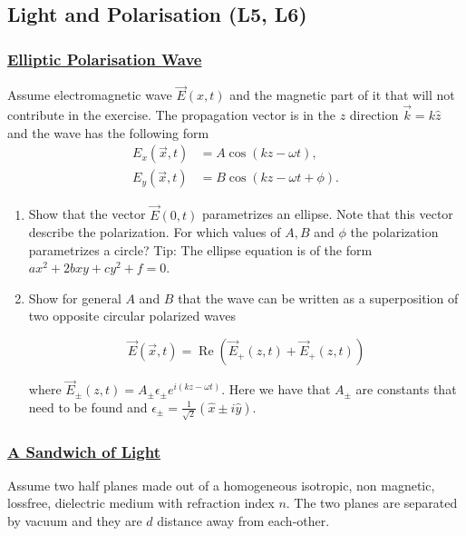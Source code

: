 \subsection{Light and Polarisation (\textbf{L5, L6})}

\subsubsection{\hyperref[EllipticPolarisationWave]{Elliptic Polarisation Wave}}

Assume electromagnetic wave $\vec{E}(x, t)$ and the magnetic part of it that will not contribute in the exercise. The propagation vector is in the $z$ direction $\vec{k}=k \hat{z}$ and the wave has the following form
\begin{subequations}
	\begin{align}
		E_{x}(\vec{x}, t)&=A \cos (k z-\omega t), \\
		E_{y}(\vec{x}, t)&=B \cos (k z-\omega t+\phi).
	\end{align}
\end{subequations}

\begin{enumerate}
	\item Show that the vector $\vec{E}(0, t)$ parametrizes an ellipse. Note that this vector describe the polarization. For which values of $A, B$ and $\phi$ the polarization parametrizes a circle? Tip: The ellipse equation is of the form $a x^{2}+2 b x y+c y^{2}+f=0$.
	\item Show for general $A$ and $B$ that the wave can be written as a superposition of two opposite circular polarized waves

	\begin{equation}
		\vec{E}(\vec{x}, t)=\operatorname{Re}\left(\vec{E}_{+}(z, t)+\vec{E}_{+}(z, t)\right)
	\end{equation}

	where $\vec{E}_{\pm}(z, t)=A_{\pm} \epsilon_{\pm} e^{i(k z-\omega t)}$. Here we have that $A_{\pm}$ are constants that need to be found and $\epsilon_{\pm}=\frac{1}{\sqrt{2}}(\hat{x} \pm i \hat{y}).$
\end{enumerate}

\subsubsection{\hyperref[ASandwichofLight]{A Sandwich of Light}}

Assume two half planes made out of a homogeneous isotropic, non magnetic, lossfree, dielectric medium with refraction index $n .$ The two planes are separated by vacuum and they are $d$ distance away from each-other.

